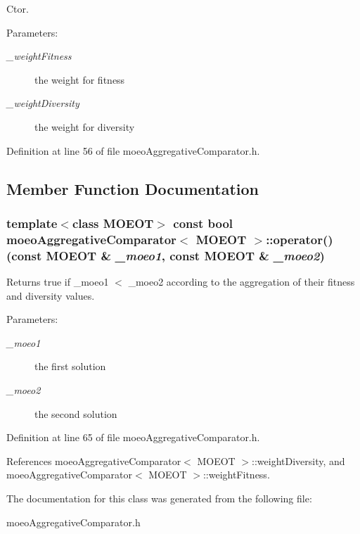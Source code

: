Ctor. 

\begin{Desc}
\item[Parameters:]
\begin{description}
\item[{\em \_\-weight\-Fitness}]the weight for fitness \item[{\em \_\-weight\-Diversity}]the weight for diversity \end{description}
\end{Desc}


Definition at line 56 of file moeo\-Aggregative\-Comparator.h.

\subsection{Member Function Documentation}
\subsubsection{\setlength{\rightskip}{0pt plus 5cm}template$<$class MOEOT$>$ const bool \bf{moeo\-Aggregative\-Comparator}$<$ MOEOT $>$::operator() (const MOEOT \& {\em \_\-moeo1}, const MOEOT \& {\em \_\-moeo2})\hspace{0.3cm}{\tt  [inline]}}\label{classmoeoAggregativeComparator_2f6745ebc2d575e64b162fc250f04b0f}


Returns true if \_\-moeo1 $<$ \_\-moeo2 according to the aggregation of their fitness and diversity values. 

\begin{Desc}
\item[Parameters:]
\begin{description}
\item[{\em \_\-moeo1}]the first solution \item[{\em \_\-moeo2}]the second solution \end{description}
\end{Desc}


Definition at line 65 of file moeo\-Aggregative\-Comparator.h.

References moeo\-Aggregative\-Comparator$<$ MOEOT $>$::weight\-Diversity, and moeo\-Aggregative\-Comparator$<$ MOEOT $>$::weight\-Fitness.

The documentation for this class was generated from the following file:\begin{CompactItemize}
\item 
moeo\-Aggregative\-Comparator.h\end{CompactItemize}
